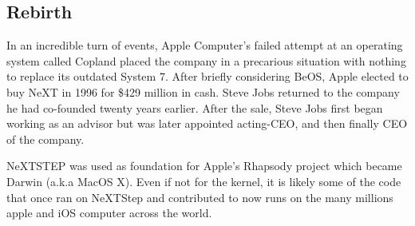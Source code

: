 \subsection{Rebirth}
In an incredible turn of events, Apple Computer's failed attempt at an operating system called Copland placed the company in a precarious situation with nothing to replace its outdated System 7. After briefly considering BeOS, Apple elected to buy NeXT in 1996 for \$429 million in cash. Steve Jobs returned to the company he had co-founded twenty years earlier. After the sale, Steve Jobs first began working as an advisor but was later appointed acting-CEO, and then finally CEO of the company.\\
\par
NeXTSTEP was used as foundation for Apple's Rhapsody project which became Darwin (a.k.a MacOS X). Even if not for the kernel, it is likely some of the code that once ran on NeXTStep and contributed to \doom now runs on the many millions apple and iOS computer across the world.\\



